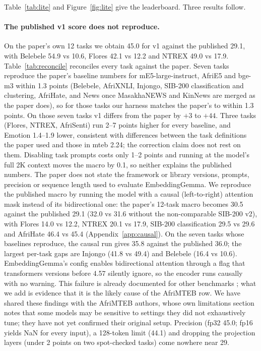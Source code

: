 \documentclass[11pt]{article}
\newcommand{\eg}{EmbeddingGemma}
\begin{document}
Table~\ref{tab:lite} and Figure~\ref{fig:lite} give the leaderboard. Three
results follow.

\paragraph{The published v1 score does not reproduce.}
On the paper's own 12 tasks we obtain 45.0 for v1 against the published 29.1,
with Belebele 54.9 vs 10.6, Flores 42.1 vs 12.2 and NTREX 49.0 vs 17.9.
Table~\ref{tab:reconcile} reconciles every task against the paper. Seven tasks
reproduce the paper's baseline numbers for mE5-large-instruct, AfriE5 and
bge-m3 within 1.3 points (Belebele, AfriXNLI, Injongo, SIB-200 classification
and clustering, AfriHate, and News once MasakhaNEWS and KinNews are merged as
the paper does), so for those tasks our harness matches the paper's to within 1.3 points. On those seven tasks v1 differs from the paper by $+3$ to $+44$. Three tasks (Flores, NTREX, AfriSenti) run 2--7 points higher for every baseline, and Emotion 1.4--1.9 lower, consistent with differences between the task definitions the paper used and those in mteb 2.24; the correction claim does not rest on them. Disabling task prompts costs only 1--2 points and running at the model's full 2K context moves the macro by 0.1, so neither explains the published numbers. The paper does not state the framework or library versions, prompts, precision or sequence length used to evaluate \eg{}. We
reproduce the published macro by running the model with a causal
(left-to-right) attention mask instead of its bidirectional one: the paper's
12-task macro becomes 30.5 against the published 29.1 (32.0 vs 31.6
without the non-comparable SIB-200 v2), with Flores 14.0
vs 12.2, NTREX 20.1 vs 17.9, SIB-200 classification 29.5 vs 29.6 and
AfriHate 46.4 vs 45.4 (Appendix~\ref{app:causal}). On the seven tasks whose baselines reproduce, the causal run gives 35.8 against the published 36.0; the largest per-task gaps are Injongo (41.8 vs 49.4) and Belebele (16.4 vs 10.6). EmbeddingGemma's config
enables bidirectional attention through a flag that transformers versions before 4.57 silently ignore, so the encoder runs causally with no warning. This failure
is already documented for other benchmarks \cite{mteb2025gemmaissue,st2026causalissue};
what we add is evidence that it is the likely cause of the AfriMTEB row. We have shared these findings with the AfriMTEB authors, whose own limitations section notes that some models may be sensitive to settings they did not exhaustively tune; they have not yet confirmed their original setup. Precision
(fp32 45.0; fp16 yields NaN for every input), a 128-token limit (44.1) and dropping the projection layers (under 2 points on two spot-checked tasks) come nowhere near 29.
\end{document}
